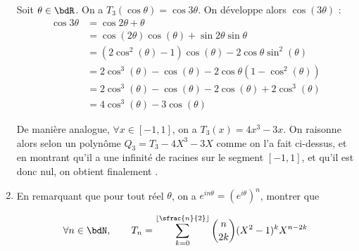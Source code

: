 \documentclass[a4paper,french,bookmarks]{article}
\begin{document}
\begin{enumerate}
{\begin{enumerate}
            \ithand Soit $\theta \in \bdR$. On a $T_3(\cos \theta) = \cos{3\theta}$. On développe alors $\cos(3\theta)$ :
            \begin{align*}
                \cos{3\theta} &= \cos{2\theta + \theta} \\
                &= \cos(2\theta)\cos(\theta) + \sin{2\theta}\sin{\theta}\\
                &= (2\cos^2(\theta) -1)\cos(\theta) - 2\cos{\theta}\sin^2(\theta)\\
                &= 2\cos^3(\theta) - \cos(\theta) - 2\cos{\theta}(1-\cos^2(\theta))\\
                &= 2\cos^3(\theta) - \cos(\theta) - 2\cos(\theta) +2\cos^3(\theta)\\
                &= 4\cos^3(\theta) - 3\cos(\theta)
            \end{align*}
            
            De manière analogue, $\forall x \in [-1, 1]$, on a $T_3(x) = 4x^3 - 3x$. On raisonne alors selon un polynôme $Q_3 = T_3 - 4X^3 - 3X$ comme on l'a fait ci-dessus, et en montrant qu'il a une infinité de racines sur le segment $[-1, 1]$, et qu'il est donc nul, on obtient finalement .
        \end{enumerate}
    }
    
    \item\label{question:2} En remarquant que pour tout réel $\theta$, on a $e^{in\theta} = \left(e^{i\theta}\right)^n$, montrer que
    
    \begin{equation}\label{eq:2}
         \forall n \in \bdN,\qquad T_n = \sum_{k=0}^{\left\lfloor \sfrac{n}{2}\right\rfloor} \binom{n}{2k} (X^2 -1)^k X^{n-2k}
    \end{equation}
    
    \boxans{
    
}
\end{enumerate}
\end{document}
